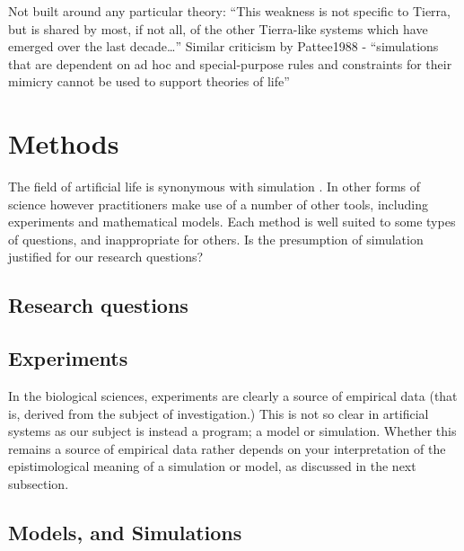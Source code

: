 Not built around any particular theory:
``This weakness is not specific to Tierra, but is shared by most, if not all, of the other Tierra-like systems which have emerged over the last decade\ldots{}''\parencite{Taylor2001}
Similar criticism by Pattee1988 - ``simulations that are dependent on ad hoc and special-purpose rules and constraints for their mimicry cannot be used to support theories of life'' \parencite{Taylor2001}

\chapter{Methods}\label{methods}

The field of artificial life is synonymous with simulation \parencite[chap.2]{Aicardi2010}. In other forms of science however practitioners make use of a number of other tools, including experiments and mathematical models. Each method is well suited to some types of questions, and inappropriate for others. Is the presumption of simulation justified for our research questions?

\section{Research questions}\label{research-questions}

\section{Experiments}\label{experiments}

In the biological sciences, experiments are clearly a source of empirical data (that is, derived from the subject of investigation.) This is not so clear in artificial systems as our subject is instead a program; a model or simulation. Whether this remains a source of empirical data rather depends on your interpretation of the epistimological meaning of a simulation or model, as discussed in the next subsection.

\section{Models, and Simulations}\label{models}


